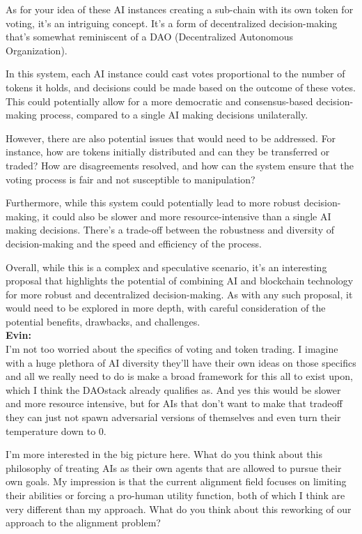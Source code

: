 \documentclass{article}[10pt]
\begin{document}
As for your idea of these AI instances creating a sub-chain with its own token for voting, it's an intriguing concept. 
It's a form of decentralized decision-making that's somewhat reminiscent of a DAO (Decentralized Autonomous Organization). \par

In this system, each AI instance could cast votes proportional to the number of tokens it holds, and decisions could be made based on the outcome of these votes. 
This could potentially allow for a more democratic and consensus-based decision-making process, compared to a single AI making decisions unilaterally.\par

However, there are also potential issues that would need to be addressed. 
For instance, how are tokens initially distributed and can they be transferred or traded? 
How are disagreements resolved, and how can the system ensure that the voting process is fair and not susceptible to manipulation?\par

Furthermore, while this system could potentially lead to more robust decision-making, it could also be slower and more resource-intensive than a single AI making decisions. 
There's a trade-off between the robustness and diversity of decision-making and the speed and efficiency of the process.\par

Overall, while this is a complex and speculative scenario, it's an interesting proposal that highlights the potential of combining AI and blockchain technology for more robust and decentralized decision-making. 
As with any such proposal, it would need to be explored in more depth, with careful consideration of the potential benefits, drawbacks, and challenges.\\

\noindent \textbf{Evin:}\\
I'm not too worried about the specifics of voting and token trading. 
I imagine with a huge plethora of AI diversity they'll have their own ideas on those specifics and all we really need to do is make a broad framework for this all to exist upon, which I think the DAOstack already qualifies as. 
And yes this would be slower and more resource intensive, but for AIs that don't want to make that tradeoff they can just not spawn adversarial versions of themselves and even turn their temperature down to 0. \par

I'm more interested in the big picture here. 
What do you think about this philosophy of treating AIs as their own agents that are allowed to pursue their own goals. 
My impression is that the current alignment field focuses on limiting their abilities or forcing a pro-human utility function, both of which I think are very different than my approach. 
What do you think about this reworking of our approach to the alignment problem?\\
\end{document}
